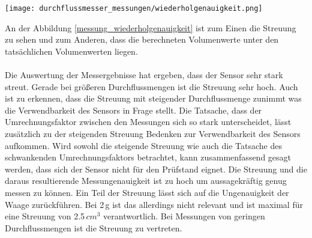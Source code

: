 \begin{figure*}[h]
	\centering
	\texttt{[image: durchflussmesser\_messungen/wiederholgenauigkeit.png]}
	\caption{Darstellung der Wiederholgenauigkeit}
	\label{messung_wiederholgenauigkeit}
\end{figure*}
\noindent
An der Abbildung \ref{messung_wiederholgenauigkeit} ist zum Einen die Streuung zu sehen und zum Anderen, dass die berechneten Volumenwerte unter den tatsächlichen Volumenwerten liegen.
\\
\\
Die Auswertung der Messergebnisse hat ergeben, dass der Sensor sehr stark streut. Gerade bei größeren Durchflussmengen ist die Streuung sehr hoch. Auch ist zu erkennen, dass die Streuung mit steigender Durchflussmenge zunimmt was die Verwendbarkeit des Sensors in Frage stellt. Die Tatsache, dass der Umrechnungsfaktor zwischen den Messungen sich so stark unterscheidet, lässt zusätzlich zu der steigenden Streuung Bedenken zur Verwendbarkeit des Sensors aufkommen. Wird sowohl die steigende Streuung wie auch die Tatsache des schwankenden Umrechnungsfaktors betrachtet, kann zusammenfassend gesagt werden, dass sich der Sensor nicht für den Prüfstand eignet. Die Streuung und die daraus resultierende Messungenauigkeit ist zu hoch um aussagekräftig genug messen zu können. Ein Teil der Streuung lässt sich auf die Ungenauigkeit der Waage zurückführen. Bei 2\,g ist das allerdings nicht relevant und ist maximal für eine Streuung von 2.5\,\(cm^3\) verantwortlich. Bei Messungen von geringen Durchflussmengen ist die Streuung zu vertreten. 